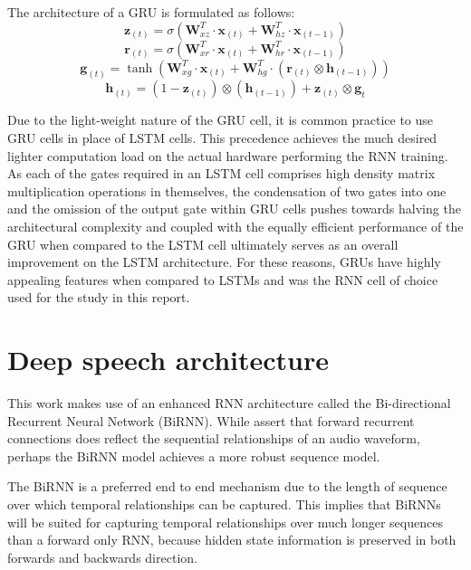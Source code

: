 The architecture of a GRU is formulated as follows:
\begin{equation}
\mathbf{z}_{(t)}=\sigma(\mathbf{W}_{xz}^T\cdot\mathbf{x}_{(t)}+\mathbf{W}_{hz}^T\cdot\mathbf{x}_{(t-1)})\label{eqn_c3_gru01}
\end{equation}
\begin{equation}
\mathbf{r}_{(t)}=\sigma(\mathbf{W}_{xr}^T\cdot\mathbf{x}_{(t)}+\mathbf{W}_{hr}^T\cdot\mathbf{x}_{(t-1)})\label{eqn_c3_gru01}
\end{equation}\begin{equation}
\mathbf{g}_{(t)}=\tanh(\mathbf{W}_{xg}^T\cdot\mathbf{x}_{(t)}+\mathbf{W}_{hg}^T\cdot(\mathbf{r}_{(t)}\otimes\mathbf{h}_{(t-1)}))\label{eqn_c3_gru01}
\end{equation}\begin{equation}
\mathbf{h}_{(t)}=(1-\mathbf{z}_{(t)})\otimes(\mathbf{h}_{(t-1)})+\mathbf{z}_{(t)}\otimes\mathbf{g}_{t}\label{eqn_c3_gru01}
\end{equation}

Due to the light-weight nature of the GRU cell, it is common practice to use GRU cells in place of LSTM cells.  This precedence achieves the much desired lighter computation load on the actual hardware performing the RNN training. As each of the gates required in an LSTM cell comprises high density matrix multiplication operations in themselves, the condensation of two gates into one and the omission of the output gate within GRU cells pushes towards halving the architectural complexity and coupled with the equally efficient performance of the GRU when compared to the LSTM cell ultimately serves as an overall improvement on the LSTM architecture.  For these reasons, GRUs have highly appealing features when compared to LSTMs and was the RNN cell of choice used for the study in this report.

\section{Deep speech architecture}\label{deepspeech}

This work makes use of an enhanced RNN architecture called the Bi-directional Recurrent Neural Network (BiRNN). While \cite{hannun2014first} assert that forward recurrent connections does reflect the sequential relationships of an audio waveform, perhaps the BiRNN model achieves a more robust sequence model.

The BiRNN is a preferred end to end mechanism due to the length of sequence over which temporal relationships can be captured.  This implies that BiRNNs will be suited for capturing temporal relationships over much longer sequences than a forward only RNN, because hidden state information is preserved in both forwards and backwards direction. 

